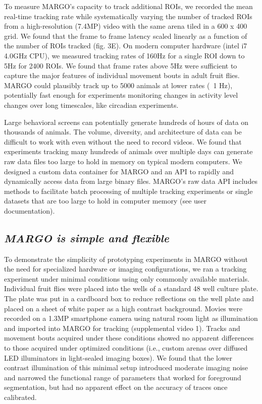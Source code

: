 \documentclass[10pt]{article}
\begin{document}
\begin{multicols}{2}
To measure MARGO's capacity to track additional ROIs, we recorded the mean real-time tracking rate while systematically varying the number of tracked ROIs from a high-resolution (7.4MP) video with the same arena tiled in a 600 x 400 grid. We found that the frame to frame latency scaled linearly as a function of the number of ROIs tracked (fig. 3E). On modern computer hardware (intel i7 4.0GHz CPU), we measured tracking rates of 160Hz for a single ROI down to 5Hz for 2400 ROIs. We found that frame rates above 5Hz were sufficient to capture the major features of individual movement bouts in adult fruit flies. MARGO could plausibly track up to 5000 animals at lower rates (~1 Hz), potentially fast enough for experiments monitoring changes in activity level changes over long timescales, like circadian experiments.

Large behavioral screens can potentially generate hundreds of hours of data on thousands of animals. The volume, diversity, and architecture of data can be difficult to work with even without the need to record videos. We found that experiments tracking many hundreds of animals over multiple days can generate raw data files too large to hold in memory on typical modern computers. We designed a custom data container for MARGO and an API to rapidly and dynamically access data from large binary files. MARGO's raw data API includes methods to facilitate batch processing of multiple tracking experiments or single datasets that are too large to hold in computer memory (see user documentation). 

\subsection*{\textit{MARGO is simple and flexible}}

To demonstrate the simplicity of prototyping experiments in MARGO without the need for specialized hardware or imaging configurations, we ran a tracking experiment under minimal conditions using only commonly available materials.  Individual fruit flies were placed into the wells of a standard 48 well culture plate. The plate was put in a cardboard box to reduce reflections on the well plate and placed on a sheet of white paper as a high contrast background. Movies were recorded on a 1.3MP smartphone camera using natural room light as illumination and imported into MARGO for tracking (supplemental video 1). Tracks and movement bouts acquired under these conditions showed no apparent differences to those acquired under optimized conditions (i.e., custom arenas over diffused LED illuminators in light-sealed imaging boxes). We found that the lower contrast illumination of this minimal setup introduced moderate imaging noise and narrowed the functional range of parameters that worked for foreground segmentation, but had no apparent effect on the accuracy of traces once calibrated.


\end{multicols}
\end{document}
